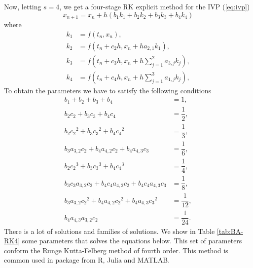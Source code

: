     Now, letting $s=4$, we get a four-stage RK explicit method for the IVP 
    (\ref{eq:ivp})
    \begin{equation}\label{RK4_method}
        x_{n+1} = x_n + h(b_{1}k_{1} + b_{2}k_{2} + b_{3}k_{3} + b_{4}k_{4})
    \end{equation}
    where
    \begin{equation}\label{RK4_kterms}
        \begin{aligned}
            k_1 &=  f(t_n, x_n), \\
            k_2 &=  f(t_n + c_2 h, x_n + h a_{2,1}k_1), \\
            k_3 &=  f\left(t_n + c_3 h, x_n + h\sum_{j=1}^{2}a_{3,j}k_j\right), \\
            k_4 &=  f\left(t_n + c_4 h, x_n + h\sum_{j=1}^{3}a_{1,j}k_j\right),
        \end{aligned}
    \end{equation}
    To obtain the parameters we have to satisfy the following conditions
    \begin{align*}
        b_1 + b_2 + b_3 + b_4 &= 1, \\
        b_2 c_2 + b_3 c_3 + b_4 c_4 &= \dfrac{1}{2}, \\
        b_2 {c_2}^{2} + b_3{c_3}^{2} + b_4{c_4}^{2} &= \dfrac{1}{3}, \\
        b_3 a_{3,2}c_2 + b_4 a_{4,2}c_2 + b_4 a_{4,3}c_3 &= \dfrac{1}{6}, \\
        b_2 {c_2}^{3} + b_3{c_3}^{3} + b_4{c_4}^{3} &= \dfrac{1}{4}, \\
        b_3 c_3 a_{3,2}c_2 + b_4 c_4 a_{4,2}c_2 + b_4 c_4 a_{4,3}c_3 &= \dfrac{1}{8}, \\
        b_3 a_{3,2}{c_2}^{2} + b_4 a_{4,2}{c_2}^{2} + b_4 a_{4,3}{c_3}^{2} &= \dfrac{1}{12}, \\
        b_4 a_{4,3}a_{3,2} c_2 &= \dfrac{1}{24}.
    \end{align*}
    There is a lot of solutions and families of solutions. We show in Table \cref{tab:BA-RK4} some parameters that solves the equations
    below. This set of parameters conform the Runge Kutta-Felberg method
    of fourth order. This method is common used in package from R, Julia and
    MATLAB. 
    
